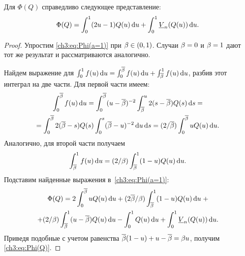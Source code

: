 {\begin{lemma}\label{ch3:lem:Phi}
  Для $\Phi(Q)$ справедливо следующее представление:
  \begin{equation}\label{ch3:eq:Phi(Q)}
    \Phi(Q) = \int_0^1 (2u - 1) Q(u) \di u + \int_0^1 \LV{n}(Q(u)) \di u.
  \end{equation}
\end{lemma}
\begin{proof}
  Упростим \eqref{ch3:eq:Phi(a=1)} при $\beta \in (0, 1)$. Случаи $\beta = 0$ и $\beta = 1$ дают тот же результат и рассматриваются аналогично.

  Найдем выражение для $\int_0^1 f(u) \mathop{}\!\mathrm{d} u = \int_0^{{{\overline{\beta}}}} f(u) \mathop{}\!\mathrm{d} u + \int_{{{\overline{\beta}}}}^1 f(u) \mathop{}\!\mathrm{d} u$, разбив этот интеграл на две части.
  Для первой части имеем:
  \begin{multline*}
    \int_0^{{{\overline{\beta}}}} f(u) \mathop{}\!\mathrm{d} u = \int_0^{{{\overline{\beta}}}} (u - {{\overline{\beta}}})^{-2} \int_{{{\overline{\beta}}}}^u 2(s - {{\overline{\beta}}}) Q(s) \mathop{}\!\mathrm{d} s = \\
    = \int_0^{{{\overline{\beta}}}} 2 ({{\overline{\beta}}} - s) Q(s) \int_0^s ({{\overline{\beta}}} - u)^{-2} \mathop{}\!\mathrm{d} u \mathop{}\!\mathrm{d} s =
    (2/{{\overline{\beta}}}) \int_0^{{{\overline{\beta}}}} u Q(u) \mathop{}\!\mathrm{d} u.
  \end{multline*}
  Аналогично, для второй части получаем
  \begin{gather*}
    \int_{{{\overline{\beta}}}}^1 f(u) \mathop{}\!\mathrm{d} u = (2/\beta) \int_{{{\overline{\beta}}}}^1 (1-u) Q(u) \mathop{}\!\mathrm{d} u.
  \end{gather*}
  Подставим найденные выражения в~\eqref{ch3:eq:Phi(a=1)}:
  \begin{multline*}
    \Phi(Q) = 2 \int_0^\DCo u Q(u) \di u + (2\DCo/\Co) \int_\DCo^1 (1-u) Q(u) \di u \; + \\
    + (2/\Co) \int_\DCo^1 (u - \DCo) Q(u) \di u - \int_0^1 Q(u) \di u + \int_0^1
    \LV{n}(Q(u)) \di u.
  \end{multline*}
  Приведя подобные с учетом равенства ${{\overline{\beta}}} (1-u) + u - {{\overline{\beta}}} = \beta u$, получим
  \eqref{ch3:eq:Phi(Q)}.
\end{proof}

}
